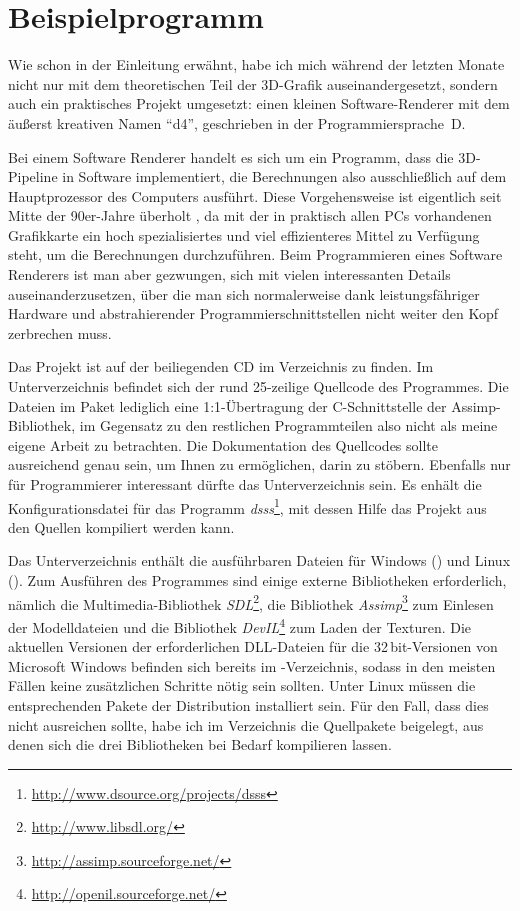 \chapter{Beispielprogramm}
\label{beispielprogramm}

Wie schon in der Einleitung erwähnt, habe ich mich während der letzten Monate nicht nur mit dem theoretischen Teil der 3D-Grafik auseinandergesetzt, sondern auch ein praktisches Projekt umgesetzt: einen kleinen Software-Renderer mit dem äußerst kreativen Namen \enquote{d4}, geschrieben in der Programmiersprache~D.

Bei einem Software Renderer handelt es sich um ein Programm, dass die 3D-Pipeline in Software implementiert, die Berechnungen also ausschließlich auf dem Hauptprozessor des Computers ausführt. Diese Vorgehensweise ist eigentlich seit Mitte der 90er-Jahre überholt , da mit der in praktisch allen PCs vorhandenen Grafikkarte ein hoch spezialisiertes und viel effizienteres Mittel zu Verfügung steht, um die Berechnungen durchzuführen. Beim Programmieren eines Software Renderers ist man aber gezwungen, sich mit vielen interessanten Details auseinanderzusetzen, über die man sich normalerweise dank leistungsfähriger Hardware und abstrahierender Programmierschnittstellen nicht weiter den Kopf zerbrechen muss.

Das Projekt ist auf der beiliegenden CD im Verzeichnis  zu finden. Im Unterverzeichnis  befindet sich der rund 25-zeilige Quellcode des Programmes. Die Dateien im Paket  lediglich eine 1:1-Übertragung der C-Schnittstelle der Assimp-Bibliothek, im Gegensatz zu den restlichen Programmteilen also nicht als meine eigene Arbeit zu betrachten. Die Dokumentation des Quellcodes sollte ausreichend genau sein, um Ihnen zu ermöglichen, darin zu stöbern. Ebenfalls nur für Programmierer interessant dürfte das Unterverzeichnis  sein. Es enhält die Konfigurationsdatei für das Programm \emph{dsss}\footnote{\url{http://www.dsource.org/projects/dsss}}, mit dessen Hilfe das Projekt aus den Quellen kompiliert werden kann.

Das Unterverzeichnis  enthält die ausführbaren Dateien für Windows () und Linux (). Zum Ausführen des Programmes sind einige externe Bibliotheken erforderlich, nämlich die Multimedia-Bibliothek \emph{SDL}\footnote{\url{http://www.libsdl.org/}}, die Bibliothek \emph{Assimp}\footnote{\url{http://assimp.sourceforge.net/}} zum Einlesen der Modelldateien und die Bibliothek \emph{DevIL}\footnote{\url{http://openil.sourceforge.net/}} zum Laden der Texturen. Die aktuellen Versionen der erforderlichen DLL-Dateien für die 32\,bit-Versionen von Microsoft Windows befinden sich bereits im -Verzeichnis, sodass in den meisten Fällen keine zusätzlichen Schritte nötig sein sollten. Unter Linux müssen die entsprechenden Pakete der Distribution installiert sein. Für den Fall, dass dies nicht ausreichen sollte, habe ich im Verzeichnis  die Quellpakete beigelegt, aus denen sich die drei Bibliotheken bei Bedarf kompilieren lassen.

